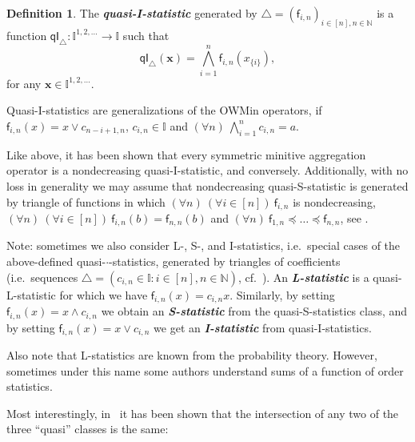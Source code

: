 \documentclass[11pt]{article}\usepackage[]{graphicx}\usepackage[]{color}
\renewcommand{\emph}[1]{\textbf{\textsl{#1}}}
\newcommand{\vect}[1]{{\mathbf{#1}}}
\newcommand{\func}[1]{{\mathsf{#1}}}
\newcommand{\Naturals}{\mathbb{N}}
\newcommand{\Ival}{\mathbb{I}}
\newcommand{\AnyPow}{^{1,2,\dots}}
\newcommand{\IvalAnyPow}{\mathbb{I}\AnyPow}
\theoremstyle{remark}
\theoremstyle{definition}
\newtheorem{definition}[theorem]{Definition}
\begin{document}
\bigskip
\begin{definition}
The \emph{quasi-I-statistic} generated by
$\triangle=(\func{f}_{i,n})_{ i\in [n],n\in\Naturals}$
is a function $\func{qI}_{\triangle}:\IvalAnyPow\to\Ival$ such that
\[
\func{qI}_{\triangle}(\vect{x})=\bigwedge_{i=1}^{n}\func{f}_{i,n}(x_{\{i\}}),
\] for any $\vect{x}\in\IvalAnyPow$.
\end{definition}
\bigskip

Quasi-I-statistics are generalizations of the OWMin operators,
if $\func{f}_{i,n}(x)=x\vee c_{n-i+1,n}$, $c_{i,n}\in\Ival$ and
$(\forall n)\ \bigwedge_{i=1}^{n}c_{i,n}=a$.

Like above, it has been shown that every
symmetric minitive aggregation operator
is a nondecreasing quasi-I-statistic, and conversely.
Additionally, with no loss in generality
we may assume that nondecreasing quasi-S-statistic is generated by triangle of functions
in which $(\forall n)\ (\forall i\in[n])\ \func{f}_{i,n}$ is nondecreasing,
$(\forall n)\ (\forall i\in[n])\ \func{f}_{i,n}(b)=\func{f}_{n,n}(b)$
and $(\forall n)\ \func{f}_{1,n}\preceq\dots\preceq\func{f}_{n,n}$,
see \cite{Gagolewski2013:om3}.

\bigskip
Note: sometimes we also consider L-, S-, and I-statistics, i.e.~special cases
of the above-defined quasi-$\cdot$-statistics,
generated by triangles of coefficients
(i.e.~sequences $\triangle=(c_{i,n}\in\Ival: i\in [n], n\in\Naturals)$,
cf.~\cite{CalvoMayor1999:remarks2eaf}).
An \emph{L-statistic} is a {quasi-L-statistic} for which we have
$\func{f}_{i,n}(x)=c_{i,n}x$. Similarly, by setting
$\func{f}_{i,n}(x)=x\wedge c_{i,n}$ we obtain an \emph{S-statistic}
from the {quasi-S-statistics} class, and
by setting $\func{f}_{i,n}(x)=x\vee c_{i,n}$
we get an \emph{I-statistic} from {quasi-I-statistics}.

Also note that L-statistics are known from the
probability theory. However, sometimes under this name
some authors understand sums of a function of order statistics.





\bigskip
Most interestingly, in~\cite{Gagolewski2013:om3} it has been shown that
the intersection of any two of the three ``quasi'' classes
is the same:
\end{document}
